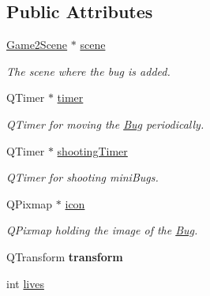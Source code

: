 \subsection*{Public Attributes}
\begin{DoxyCompactItemize}
\item 
\hypertarget{classBug_af47aa4495bad729962a03d229d8fdb1c}{\hyperlink{classGame2Scene}{Game2\-Scene} $\ast$ \hyperlink{classBug_af47aa4495bad729962a03d229d8fdb1c}{scene}}\label{classBug_af47aa4495bad729962a03d229d8fdb1c}

\begin{DoxyCompactList}\small\item\em The scene where the bug is added. \end{DoxyCompactList}\item 
\hypertarget{classBug_aa75434e0a87bdefb7a80dbfa185b3cea}{Q\-Timer $\ast$ \hyperlink{classBug_aa75434e0a87bdefb7a80dbfa185b3cea}{timer}}\label{classBug_aa75434e0a87bdefb7a80dbfa185b3cea}

\begin{DoxyCompactList}\small\item\em Q\-Timer for moving the \hyperlink{classBug}{Bug} periodically. \end{DoxyCompactList}\item 
\hypertarget{classBug_a4fa5d0ebcd95fcd80a79f5b17c2d1c49}{Q\-Timer $\ast$ \hyperlink{classBug_a4fa5d0ebcd95fcd80a79f5b17c2d1c49}{shooting\-Timer}}\label{classBug_a4fa5d0ebcd95fcd80a79f5b17c2d1c49}

\begin{DoxyCompactList}\small\item\em Q\-Timer for shooting mini\-Bugs. \end{DoxyCompactList}\item 
\hypertarget{classBug_a31e919ead62893f77e673c6563a8fab2}{Q\-Pixmap $\ast$ \hyperlink{classBug_a31e919ead62893f77e673c6563a8fab2}{icon}}\label{classBug_a31e919ead62893f77e673c6563a8fab2}

\begin{DoxyCompactList}\small\item\em Q\-Pixmap holding the image of the \hyperlink{classBug}{Bug}. \end{DoxyCompactList}\item 
\hypertarget{classBug_a94745a4c20719851219de0fd11f699f4}{Q\-Transform {\bfseries transform}}\label{classBug_a94745a4c20719851219de0fd11f699f4}

\item 
\hypertarget{classBug_ac72cf078fdb04c5757417b7de8cbf64c}{int \hyperlink{classBug_ac72cf078fdb04c5757417b7de8cbf64c}{lives}}\label{classBug_ac72cf078fdb04c5757417b7de8cbf64c}


\end{DoxyCompactItemize}
